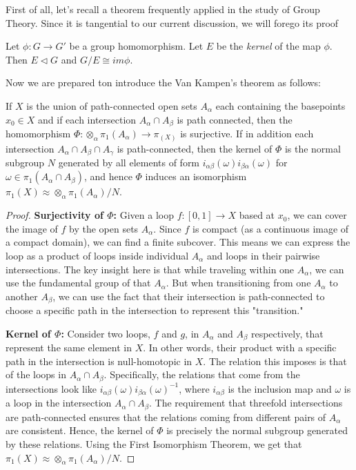 \documentclass[12pt]{article}
\begin{document}
First of all, let's recall a theorem frequently applied in the study of Group Theory. Since it is tangential to our current discussion, we will forego its proof

\begin{theorem}
	Let \(\phi : G \rightarrow G'\) be a group homomorphism. Let \(E\) be the \textit{kernel} of the map \(\phi\). Then \(E \triangleleft G\) and \(G / E \cong im \phi\).
\end{theorem}

Now we are prepared ton introduce the Van Kampen's theorem as follows:

\begin{theorem}
	If \(X\) is the union of path-connected open sets \(A_\alpha\) each containing the basepoints \(x_0 \in X\) and if each intersection \(A_\alpha \cap A_\beta\) is path connected, then the homomorphism \(\Phi : \otimes_\alpha \pi_1(A_\alpha) \rightarrow \pi_(X)\) is surjective. If in addition each intersection \(A_\alpha \cap A_\beta \cap A_\gamma\) is path-connected, then the kernel of \(\Phi\) is the normal subgroup \(N\) generated by all elements of form \(i_{\alpha \beta}(\omega) i_{\beta \alpha}(\omega)\) for \(\omega \in \pi_1(A_\alpha \cap A_\beta)\), and hence \(\Phi\) induces an isomorphism \(\pi_1(X) \approx \otimes_\alpha \pi_1(A_\alpha) / N\).
\end{theorem}

\begin{proof}
	
	\textbf{Surjectivity of \(\Phi\):} Given a loop \(f: [0,1] \rightarrow X\) based at \(x_0\), we can cover the image of \(f\) by the open sets \(A_\alpha\). Since \(f\) is compact (as a continuous image of a compact domain), we can find a finite subcover. This means we can express the loop as a product of loops inside individual \(A_\alpha\) and loops in their pairwise intersections. The key insight here is that while traveling within one \(A_\alpha\), we can use the fundamental group of that \(A_\alpha\). But when transitioning from one \(A_\alpha\) to another \(A_\beta\), we can use the fact that their intersection is path-connected to choose a specific path in the intersection to represent this "transition."
	
	\textbf{Kernel of \(\Phi\):} Consider two loops, \(f\) and \(g\), in \(A_\alpha\) and \(A_\beta\) respectively, that represent the same element in \(X\). In other words, their product with a specific path in the intersection is null-homotopic in \(X\). The relation this imposes is that of the loops in \(A_\alpha \cap A_\beta\). Specifically, the relations that come from the intersections look like \(i_{\alpha \beta}(\omega) i_{\beta \alpha}(\omega)^{-1}\), where \(i_{\alpha \beta}\) is the inclusion map and \(\omega\) is a loop in the intersection \(A_\alpha \cap A_\beta\). The requirement that threefold intersections are path-connected ensures that the relations coming from different pairs of \(A_\alpha\) are consistent. Hence, the kernel of \(\Phi\) is precisely the normal subgroup generated by these relations. Using the First Isomorphism Theorem, we get that \(\pi_1(X) \approx \otimes_\alpha \pi_1(A_\alpha) / N\).
\end{proof}
\end{document}
